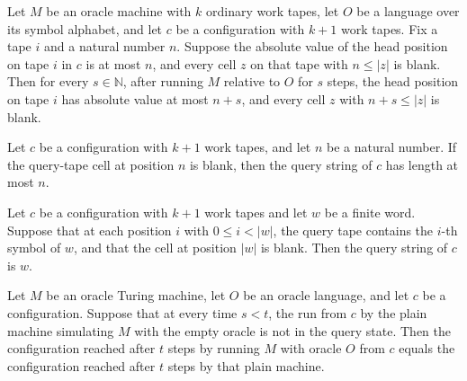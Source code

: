 \begin{theorem}
\label{Turing.OracleTM.runFrom_radius}
\leanok
{}
Let $M$ be an oracle machine with $k$ ordinary work tapes, let $O$ be a language over
its symbol alphabet, and let $c$ be a configuration with $k+1$ work tapes. Fix a tape
$i$ and a natural number $n$. Suppose the absolute value of the head position on tape
$i$ in $c$ is at most $n$, and every cell $z$ on that tape with $n\le |z|$ is blank.
Then for every $s\in\mathbb{N}$, after running $M$ relative to $O$ for $s$ steps, the
head position on tape $i$ has absolute value at most $n+s$, and every cell $z$ with
$n+s\le |z|$ is blank.
\end{theorem}

\begin{theorem}
\label{Turing.OracleTM.queryString_length_le_of_blank}
\leanok
{}
Let $c$ be a configuration with $k+1$ work tapes, and let $n$ be a natural number. If
the query-tape cell at position $n$ is blank, then the query string of $c$ has length at
most $n$.
\end{theorem}

\begin{theorem}
\label{Turing.OracleTM.queryString_eq_of_cells}
\leanok
{}
Let $c$ be a configuration with $k+1$ work tapes and let $w$ be a finite word. Suppose
that at each position $i$ with $0\le i<|w|$, the query tape contains the $i$-th symbol
of $w$, and that the cell at position $|w|$ is blank. Then the query string of $c$ is
$w$.
\end{theorem}

\begin{theorem}
\label{Turing.OracleTM.runFrom_eq_plainEmptyOracle}
\leanok
{}
Let $M$ be an oracle Turing machine, let $O$ be an oracle language, and let $c$ be a
configuration. Suppose that at every time $s<t$, the run from $c$ by the plain machine
simulating $M$ with the empty oracle is not in the query state. Then the configuration
reached after $t$ steps by running $M$ with oracle $O$ from $c$ equals the configuration
reached after $t$ steps by that plain machine.
\end{theorem}
